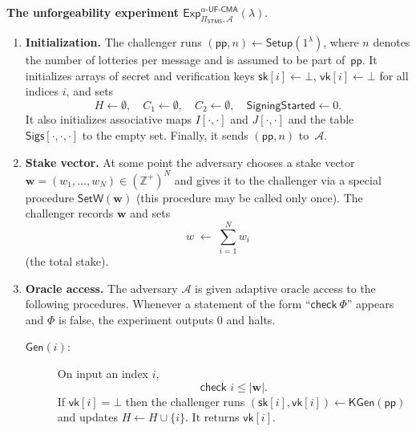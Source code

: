 \documentclass{article}
\begin{document}
\medskip
\noindent
\textbf{The unforgeability experiment
$\mathsf{Exp}^{\alpha\textsf{-UF-CMA}}_{\Pi_{\mathsf{STMS}},\mathcal{A}}(\lambda)$}.

\begin{enumerate}
  \item \textbf{Initialization.}
        The challenger runs
        $(\mathsf{pp}, n) \leftarrow \mathsf{Setup}(1^\lambda)$,
        where $n$ denotes the number of lotteries per message and is assumed
        to be part of~$\mathsf{pp}$.
        It initializes arrays of secret and verification keys
        $\mathsf{sk}[i] \gets \bot$, $\mathsf{vk}[i] \gets \bot$ for all
        indices $i$, and sets
        \[
          H \gets \emptyset,\quad
          C_1 \gets \emptyset,\quad
          C_2 \gets \emptyset,\quad
          \mathsf{SigningStarted} \gets 0.
        \]
        It also initializes associative maps
        $I[\cdot,\cdot]$ and $J[\cdot,\cdot]$ and the table
        $\mathsf{Sigs}[\cdot,\cdot,\cdot]$ to the empty set.
        Finally, it sends $(\mathsf{pp}, n)$ to~$\mathcal{A}$.

  \item \textbf{Stake vector.}
        At some point the adversary chooses a stake vector
        $\mathbf{w} = (w_1,\dots,w_N) \in (\mathbb{Z}^+)^N$
        and gives it to the challenger via a special procedure
        $\mathsf{SetW}(\mathbf{w})$ (this procedure may be called only once).
        The challenger records $\mathbf{w}$ and sets
        \[
          w \;\gets\; \sum_{i=1}^{N} w_i
        \]
        (the total stake).

  \item \textbf{Oracle access.}
        The adversary $\mathcal{A}$ is given adaptive oracle access to the
        following procedures.  Whenever a statement of the form
        ``$\textsf{check}~\Phi$'' appears and $\Phi$ is false, the
        experiment outputs $0$ and halts.

        \begin{description}
          \item[$\mathsf{Gen}(i)$:]
                On input an index $i$,
                \[
                  \textsf{check } i \leq |\mathbf{w}|.
                \]
                If $\mathsf{vk}[i] = \bot$ then the challenger runs
                $(\mathsf{sk}[i],\mathsf{vk}[i]) \leftarrow
                   \mathsf{KGen}(\mathsf{pp})$
                and updates
                $H \gets H \cup \{i\}$.
                It returns $\mathsf{vk}[i]$.


\end{description}
\end{enumerate}
\end{document}

